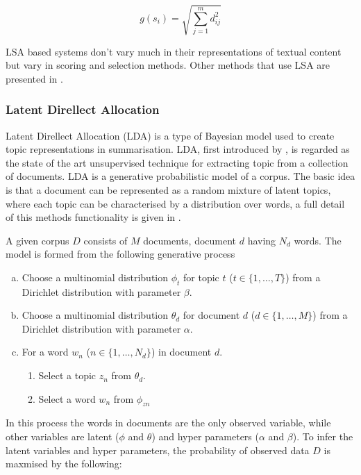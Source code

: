 \begin{equation}
      g(s_i) = \sqrt{\sum_{j=1}^m d_{ij}^2}
      \label{lsaEqu}
\end{equation}

LSA based systems don’t vary much in their representations of textual content but vary in scoring and selection methods. Other methods that use LSA are presented in \citep{hachey2006dimensionality,ozsoy2010text}.

\subsubsection{Latent Direllect Allocation}
Latent Direllect Allocation (LDA) is a type of Bayesian model used to create topic representations in summarisation. LDA, first introduced by \citet{blei2003latent}, is regarded as the state of the art unsupervised technique for extracting topic from a collection of documents. LDA is a generative probabilistic model of a corpus. The basic idea is that a document can be represented as a random mixture of latent topics, where each topic can be characterised by a distribution over words, a full detail of this methods functionality is given in \citep{blei2003latent,steyvers2007probabilistic}.

A given corpus $D$ consists of $M$ documents, document $d$ having $N_d$ words.
The model is formed from the following generative process

\begin{enumerate}[(a)]
      \item Choose a multinomial distribution $\phi_t$ for topic $t$ ($t \in \{1,\dots,T\}$) from a Dirichlet distribution with parameter $\beta$.
      \item Choose a multinomial distribution $\theta_d$ for document $d$ ($d \in \{1,\dots,M\}$) from a Dirichlet distribution with parameter $\alpha$.
      \item For a word $w_n$ ($n \in \{1,\dots,{N_d}\}$) in document $d$.
      \begin{enumerate}[]
            \item Select a topic $z_n$ from $\theta_d$.
            \item Select a word $w_n$ from $\phi_{zn}$
      \end{enumerate}
\end{enumerate}

In this process the words in documents are the only observed variable, while other variables are latent ($\phi$ and $\theta$) and hyper parameters ($\alpha$ and $\beta$). To infer the latent variables and hyper parameters, the probability of observed data $D$ is maxmised by the following:

